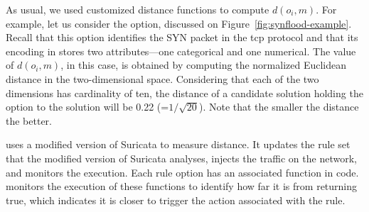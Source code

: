 \documentclass[runningheads]{llncs}
\begin{document}
As usual, we used customized distance functions to compute $d(o_i,
m)$. For example, let us consider the  option, discussed
on Figure~\ref{fig:synflood-example}. Recall that this option
identifies the SYN packet in the tcp protocol and that its encoding in
\tname{} stores two attributes---one categorical and one
numerical. The value of $d(o_i, m)$, in this case, is obtained by
computing the normalized Euclidean distance in the two-dimensional
space. Considering that each of the two dimensions has cardinality of
ten, the distance of a candidate solution holding the option
 to the solution will be 0.22
(=$1/\sqrt{20}$). Note that the smaller the distance the better.

\tname{} uses a modified version of Suricata to measure distance. It
updates the rule set that the modified version of Suricata analyses,
injects the traffic on the network, and monitors the execution. Each
rule option has an associated  function in code. \tname{}
monitors the execution of these functions to identify how far it is
from returning true, which indicates it is closer to trigger the
action associated with the rule. 

\end{document}
